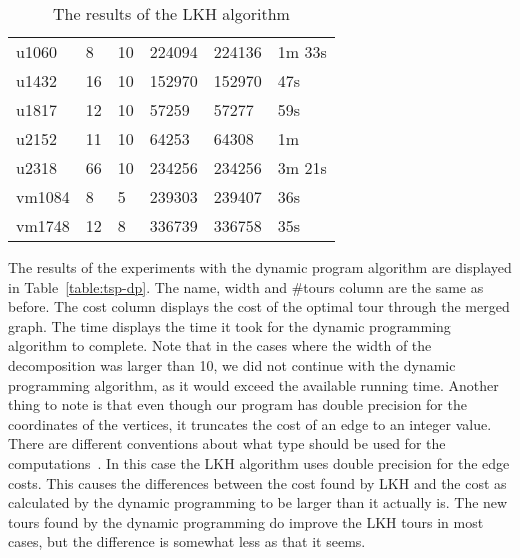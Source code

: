 \documentclass[12pt]{article}
\begin{document}
\begin{table}
\begin{tabular}{l l l l l l}
        u1060   & 8     & 10        & 224094    & 224136    & 1m 33s \\
        u1432   & 16    & 10        & 152970    & 152970    & 47s \\
        u1817   & 12    & 10        & 57259     & 57277     & 59s \\
        u2152   & 11    & 10        & 64253     & 64308     & 1m \\
        u2318   & 66    & 10        & 234256    & 234256    & 3m 21s \\
        vm1084  & 8     & 5         & 239303    & 239407    & 36s \\
        vm1748  & 12    & 8         & 336739    & 336758    & 35s \\
    \end{tabular}
    \caption{The results of the LKH algorithm}
    \label{table:tsp-heuristics}
    \end{table}

    The results of the experiments with the dynamic program algorithm are displayed in
    Table~\ref{table:tsp-dp}. The name, width and \#tours column are the same as before. The cost
    column displays the cost of the optimal tour through the merged graph. The time displays the
    time it took for the dynamic programming algorithm to complete.
    Note that in the cases where the width of the decomposition was larger than 10, we did not
    continue with the dynamic programming algorithm, as it would exceed the available running time.
    Another thing to note is that even though our program has double precision for the coordinates
    of the vertices, it truncates the cost of an edge to an integer value. There are different
    conventions about what type should be used for the computations~\cite{vrp-summary-1}. In this
    case the LKH algorithm uses double precision for the edge costs. This causes the differences
    between the cost found by LKH and the cost as calculated by the dynamic programming to be
    larger than it actually is. The new tours found by the dynamic programming do improve the LKH
    tours in most cases, but the difference is somewhat less as that it seems.
\end{document}
